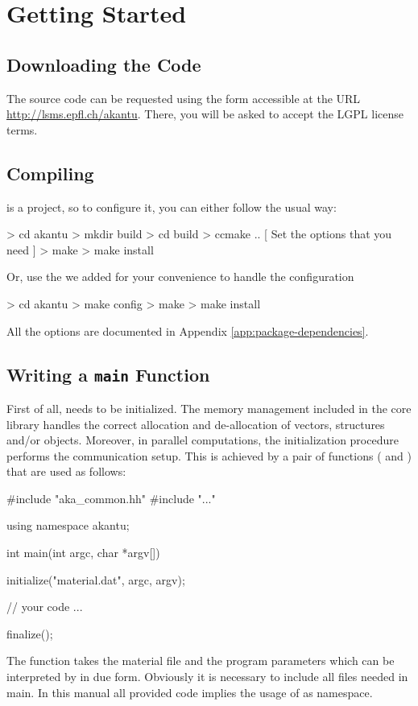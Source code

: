 \chapter{Getting Started}
\section{Downloading the Code}

The \akantu source code can be requested using the form accessible at the URL
\url{http://lsms.epfl.ch/akantu}.  There, you will be asked to accept the LGPL
license terms.

\section{Compiling \akantu}

\akantu is a  project, so to configure it, you can either
follow the usual way:
\begin{command}
  > cd akantu
  > mkdir build
  > cd build
  > ccmake ..
  [ Set the options that you need ]
  > make
  > make install
\end{command}

\noindent Or, use the  we added for your convenience to
handle the  configuration

\begin{command}
  > cd akantu
  > make config
  > make
  > make install
\end{command}

\noindent All the \akantu options are documented in Appendix
\ref{app:package-dependencies}.


\section{Writing a \texttt{main} Function\label{sect:common:main}}
\label{sec:writing_main}

First of all, \akantu needs to be initialized.  The memory management
included in the core library handles the correct allocation and
de-allocation of vectors, structures and/or objects. Moreover, in
parallel computations, the initialization procedure performs the
communication setup. This is achieved by a pair of functions
( and ) that are used as follows:
\begin{cpp}
#include "aka_common.hh"
#include "..."

using namespace akantu;

int main(int argc, char *argv[]) {
  initialize("material.dat", argc, argv);

  // your code
  ...

  finalize();
}
\end{cpp}
The  function takes the material file and the program
parameters which can be interpreted by \akantu in due form. Obviously
it is necessary to include all files needed in main. In this manual
all provided code implies the usage of  as namespace.


